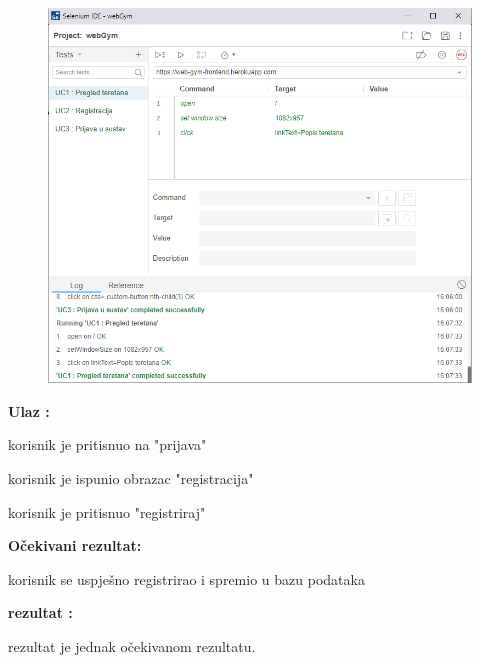 				\begin{figure}[H]
        			\hspace*{-1.5cm}
        			\includegraphics[scale=0.5]{dijagrami/UC1.PNG} %
        			\centering
        			\label{fig:promjene}
	        	\end{figure}
				
				\noindent {}
                \begin{packed_item}
						\item  \textbf{Ulaz : } 
						\item[] \begin{packed_enum}
	
							\item korisnik je pritisnuo na "prijava"
							\item korisnik je ispunio obrazac "registracija"
							\item korisnik je pritisnuo "registriraj"

						\end{packed_enum}
						\item  \textbf{Očekivani rezultat: } 
						\item[] \begin{packed_enum}
	
							\item korisnik se uspješno registrirao i spremio u bazu podataka

						\end{packed_enum}
						
						\item  \textbf{rezultat : }
						\item[] \begin{packed_enum}
	
							\item rezultat je jednak očekivanom rezultatu.

						\end{packed_enum}

				\end{packed_item}
				

